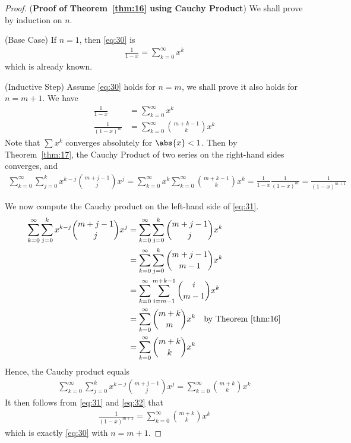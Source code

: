 \documentclass[thmcnt=section, 12pt]{elegantbook}
\begin{document}
\begin{proof} (\textbf{Proof of Theorem~\ref{thm:16} using Cauchy Product}) %
    We shall prove by induction on $n$.

    \par (Base Case) If $n = 1$, then \eqref{eq:30} is 
    \begin{align*}
        \frac{1}{1-x}
        = \sum_{k=0}^\infty x^k
    \end{align*}
    which is already known.

    \par (Inductive Step) Assume \eqref{eq:30} holds for $n = m$, we shall prove it also holds for $n = m+1$.
    We have 
    \begin{align*}
        \frac{1}{1-x}
        &= \sum_{k=0}^\infty x^k \\ 
        \frac{1}{(1-x)^m}
        &= \sum_{k=0}^\infty \binom{m+k-1}{k} x^k
    \end{align*}
    Note that $\sum x^k$ converges absolutely for $\abs{x} < 1$. Then by Theorem~\ref{thm:17}, the Cauchy Product of two series on the right-hand sides converges, and 
    \begin{align}
        \sum_{k=0}^\infty \sum_{j=0}^k x^{k-j} \binom{m+j-1}{j} x^j
        = \sum_{k=0}^\infty x^k \sum_{k=0}^\infty \binom{m+k-1}{k} x^k 
        = \frac{1}{1-x} \frac{1}{(1-x)^m}
        = \frac{1}{(1-x)^{m+1}}
        \label{eq:31}
    \end{align}
    
    \par We now compute the Cauchy product on the left-hand side of \eqref{eq:31}. 
    \begin{align*}
        \sum_{k=0}^\infty \sum_{j=0}^k x^{k-j} \binom{m+j-1}{j} x^j
        &= \sum_{k=0}^\infty \sum_{j=0}^k \binom{m+j-1}{j} x^k \\ 
        &= \sum_{k=0}^\infty \sum_{j=0}^k \binom{m+j-1}{m-1} x^k \\ 
        &= \sum_{k=0}^\infty \sum_{i=m-1}^{m+k-1} \binom{i}{m-1} x^k \\
        &= \sum_{k=0}^\infty \binom{m+k}{m} x^k 
        \quad \text{by Theorem~\ref{thm:16}}\\
        &= \sum_{k=0}^\infty \binom{m+k}{k} x^k 
    \end{align*}
    Hence, the Cauchy product equals
    \begin{align}
        \sum_{k=0}^\infty \sum_{j=0}^k x^{k-j} \binom{m+j-1}{j} x^j
        = \sum_{k=0}^\infty \binom{m+k}{k} x^k 
        \label{eq:32}
    \end{align}
    It then follows from \eqref{eq:31} and \eqref{eq:32} that 
    \begin{align*}
        \frac{1}{(1-x)^{m+1}}
        = \sum_{k=0}^\infty \binom{m+k}{k} x^k
    \end{align*}
    which is exactly \eqref{eq:30} with $n=m+1$.
\end{proof}
\end{document}
